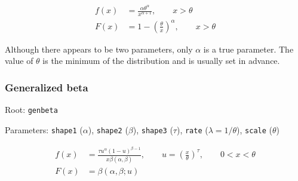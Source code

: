 \documentclass[x11names]{article}
\newcommand{\code}[1]{\texttt{#1}}
\begin{document}
\begin{align*}
  f(x) &= \frac{\alpha
    \theta^\alpha}{x^{\alpha+1}}, \qquad x > \theta \\
  F(x) &= 1 - \left( \frac{\theta}{x} \right)^\alpha, \qquad x >
  \theta
\end{align*}

Although there appears to be two parameters, only $\alpha$ is a true
parameter. The value of $\theta$ is the minimum of the distribution
and is usually set in advance.

\subsubsection*{Generalized beta}

\begin{compactitem}[]
\item Root: \code{genbeta}
\item Parameters: \code{shape1} ($\alpha$),
      \code{shape2} ($\beta$),
      \code{shape3} ($\tau$),
      \code{rate}   ($\lambda = 1/\theta$),
      \code{scale}  ($\theta$)
\end{compactitem}

\begin{align*}
  f(x) &= \frac{\tau u^\alpha (1 - u)^{\beta - 1}}{x \beta (\alpha, \beta)},
  \qquad u = \left( \frac{x}{\theta} \right)^\tau,
  \qquad 0 < x < \theta \\
  F(x) &= \beta (\alpha, \beta ; u)
\end{align*}


\end{document}
